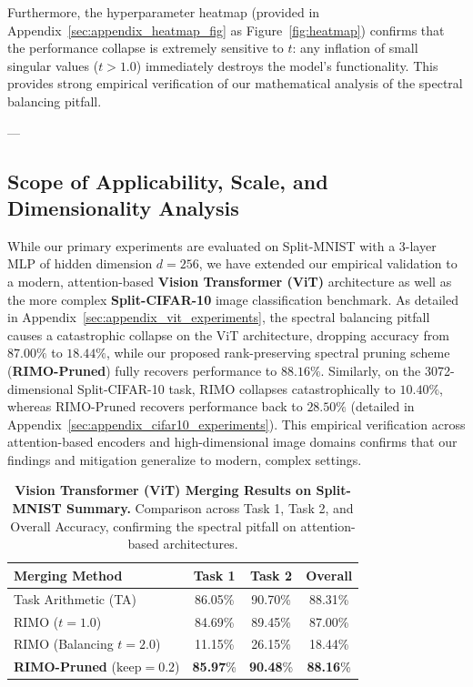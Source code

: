 Furthermore, the hyperparameter heatmap (provided in Appendix~\ref{sec:appendix_heatmap_fig} as Figure~\ref{fig:heatmap}) confirms that the performance collapse is extremely sensitive to $t$: any inflation of small singular values ($t > 1.0$) immediately destroys the model's functionality. This provides strong empirical verification of our mathematical analysis of the spectral balancing pitfall.

---

\subsection{Scope of Applicability, Scale, and Dimensionality Analysis}
\label{subsec:scale}
While our primary experiments are evaluated on Split-MNIST with a 3-layer MLP of hidden dimension $d = 256$, we have extended our empirical validation to a modern, attention-based \textbf{Vision Transformer (ViT)} architecture as well as the more complex \textbf{Split-CIFAR-10} image classification benchmark. As detailed in Appendix~\ref{sec:appendix_vit_experiments}, the spectral balancing pitfall causes a catastrophic collapse on the ViT architecture, dropping accuracy from $87.00\%$ to $18.44\%$, while our proposed rank-preserving spectral pruning scheme (\textbf{RIMO-Pruned}) fully recovers performance to $88.16\%$. Similarly, on the 3072-dimensional Split-CIFAR-10 task, RIMO collapses catastrophically to $10.40\%$, whereas RIMO-Pruned recovers performance back to $28.50\%$ (detailed in Appendix~\ref{sec:appendix_cifar10_experiments}). This empirical verification across attention-based encoders and high-dimensional image domains confirms that our findings and mitigation generalize to modern, complex settings.

\begin{table}[ht]
\centering
\caption{\textbf{Vision Transformer (ViT) Merging Results on Split-MNIST Summary.} Comparison across Task 1, Task 2, and Overall Accuracy, confirming the spectral pitfall on attention-based architectures.}
\label{tab:vi_summary}
\vskip 0.05in
\begin{footnotesize}
\begin{sc}
\begin{tabular}{lccc}
\toprule
Merging Method & Task 1 & Task 2 & Overall \\
\midrule
Task Arithmetic (TA) & 86.05\% & 90.70\% & 88.31\% \\
RIMO ($t=1.0$) & 84.69\% & 89.45\% & 87.00\% \\
RIMO (Balancing $t=2.0$) & 11.15\% & 26.15\% & 18.44\% \\
\textbf{RIMO-Pruned} ($\text{keep}=0.2$) & \textbf{85.97}\% & \textbf{90.48}\% & \textbf{88.16}\% \\
\bottomrule
\end{tabular}
\end{sc}
\end{footnotesize}
\vskip -0.1in
\end{table}

